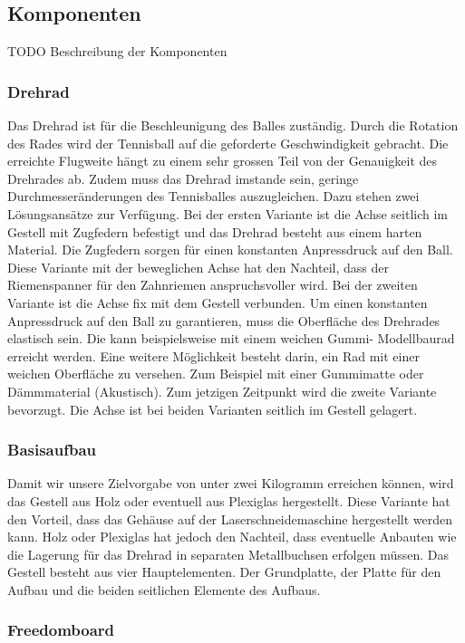 \subsection{Komponenten}
TODO Beschreibung der Komponenten
\subsubsection{Drehrad}

Das Drehrad ist für die Beschleunigung des Balles zuständig. Durch die Rotation des Rades wird der Tennisball auf die geforderte Geschwindigkeit gebracht. Die erreichte Flugweite hängt zu einem sehr grossen Teil von der Genauigkeit des Drehrades ab. Zudem muss das Drehrad imstande sein, geringe Durchmesseränderungen des Tennisballes auszugleichen. Dazu stehen zwei Lösungsansätze zur Verfügung. Bei der ersten Variante ist die Achse seitlich im Gestell mit Zugfedern befestigt und das Drehrad besteht aus einem harten Material. Die Zugfedern sorgen für einen konstanten Anpressdruck auf den Ball. Diese Variante mit der beweglichen Achse hat den Nachteil, dass der Riemenspanner für den Zahnriemen anspruchsvoller wird. Bei der zweiten Variante ist die Achse fix mit dem Gestell verbunden. Um einen konstanten Anpressdruck auf den Ball zu garantieren, muss die Oberfläche des Drehrades elastisch sein. Die kann beispielsweise mit einem weichen Gummi- Modellbaurad erreicht werden. Eine weitere Möglichkeit besteht darin, ein Rad mit einer weichen Oberfläche zu versehen. Zum Beispiel mit einer Gummimatte oder Dämmmaterial (Akustisch). Zum jetzigen Zeitpunkt wird die zweite Variante bevorzugt. Die Achse ist bei beiden Varianten seitlich im Gestell gelagert. 
\subsubsection{Basisaufbau}
Damit wir unsere Zielvorgabe von unter zwei Kilogramm erreichen können, wird das Gestell aus Holz oder eventuell aus Plexiglas hergestellt. Diese Variante hat den Vorteil, dass das Gehäuse auf der Laserschneidemaschine hergestellt werden kann. Holz oder Plexiglas hat jedoch den Nachteil, dass eventuelle Anbauten wie die Lagerung für das Drehrad in separaten Metallbuchsen erfolgen müssen. Das Gestell besteht aus vier Hauptelementen. Der Grundplatte, der Platte für den Aufbau und die beiden seitlichen Elemente des Aufbaus.

\subsubsection{Freedomboard}


